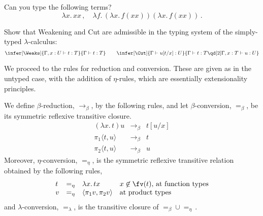 \documentclass[12pt]{article}
\begin{document}
%
\begin{myexercise}
Can you type the following terms?
\[ \lambda x. \, xx\,,\quad \lambda f. \, (\lambda x.\, f(x x)) (\lambda x. \, f(x x))\,. \]
\end{myexercise}
\begin{myexercise} Show that Weakening and Cut are admissible in the typing system of the simply-typed $\lambda$-calculus:
    \[ \infer[\Weaks]{\Gamma,x:U\vdash t:T}{\Gamma\vdash t:T}\qquad
    \infer[\Cut]{\Gamma\vdash u[t/x]:U}{\Gamma\vdash t:T\qd[2]\Gamma,x:T\vdash u:U} \]
\end{myexercise}
%
We proceed to the rules for reduction and conversion. These are given as in the untyped case, with the addition of $\eta$-rules, which are essentially
extensionality principles.
\begin{mydefinition}
We define $\beta$-reduction, $\longrightarrow_\beta$, by the following rules, and let $\beta$-conversion, $=_\beta$, be its symmetric reflexive
transitive closure.
\[ \begin{array}{lcl}
(\lambda x. \, t ) u & \longrightarrow_\beta & t[u/x] \\
\pi_1 \langle t, u \rangle & \longrightarrow_\beta & t \\
\pi_2 \langle t, u \rangle & \longrightarrow_\beta & u
\end{array} \]
Moreover, $\eta$-conversion, $=_\eta$, is the symmetric reflexive transitive relation obtained by the following rules,
\[ \begin{array}{lcl@{\quad}l}
t & =_\eta & \lambda x.\, tx & \mbox{$x\not\in\fv(t)$, at function  types} \\
v & =_\eta & \langle \pi_1 v, \pi_2 v \rangle & \mbox{at product types}
\end{array} \]
and $\lambda$-conversion, $=_\lambda$, is the transitive closure of $=_\beta\cup=_\eta$\,.\deq
\end{mydefinition}
\end{document}
